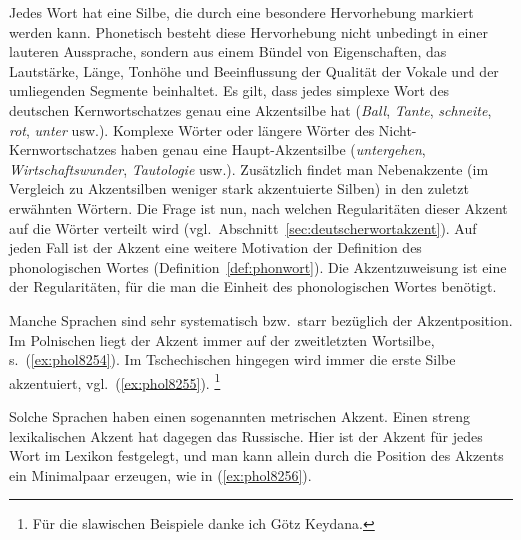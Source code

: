 Jedes Wort hat eine Silbe, die durch eine besondere Hervorhebung markiert werden kann.
Phonetisch besteht diese Hervorhebung nicht unbedingt in einer lauteren Aussprache, sondern aus einem Bündel von Eigenschaften, das Lautstärke, Länge, Tonhöhe und Beeinflussung der Qualität der Vokale und der umliegenden Segmente beinhaltet.
Es gilt, dass jedes simplexe Wort des deutschen Kernwortschatzes genau eine Akzentsilbe hat (\textit{\Akz Ball}, \textit{\Akz Tante}, \textit{\Akz schneite}, \textit{\Akz rot}, \textit{\Akz unter} usw.).
Komplexe Wörter oder längere Wörter des Nicht-Kernwortschatzes haben genau eine Haupt-Akzentsilbe (\textit{\Akz untergehen}, \textit{\Akz Wirtschaftswunder}, \textit{Tautolo\Akz gie} usw.).
Zusätzlich findet man Nebenakzente (im Vergleich zu Akzentsilben weniger stark akzentuierte Silben) in den zuletzt erwähnten Wörtern.
Die Frage ist nun, nach welchen Regularitäten dieser Akzent auf die Wörter verteilt wird (vgl.\ Abschnitt~\ref{sec:deutscherwortakzent}).
Auf jeden Fall ist der Akzent eine weitere Motivation der Definition des phonologischen Wortes (Definition~\ref{def:phonwort}).
Die Akzentzuweisung ist eine der Regularitäten, für die man die Einheit des phonologischen Wortes benötigt.


\enlargethispage{1\baselineskip}
Manche Sprachen sind sehr systematisch bzw.\ starr bezüglich der Akzentposition.
Im Polnischen liegt der Akzent immer auf der zweitletzten Wortsilbe, s.\ (\ref{ex:phol8254}).
Im Tschechischen hingegen wird immer die erste Silbe akzentuiert, vgl.\ (\ref{ex:phol8255}).%
\footnote{Für die slawischen Beispiele danke ich Götz Keydana.}

\begin{exe}
\end{exe}

Solche Sprachen haben einen sogenannten metrischen Akzent.
Einen streng lexikalischen Akzent hat dagegen das Russische.
Hier ist der Akzent für jedes Wort im Lexikon festgelegt, und man kann allein durch die Position des Akzents ein Minimalpaar erzeugen, wie in (\ref{ex:phol8256}).

